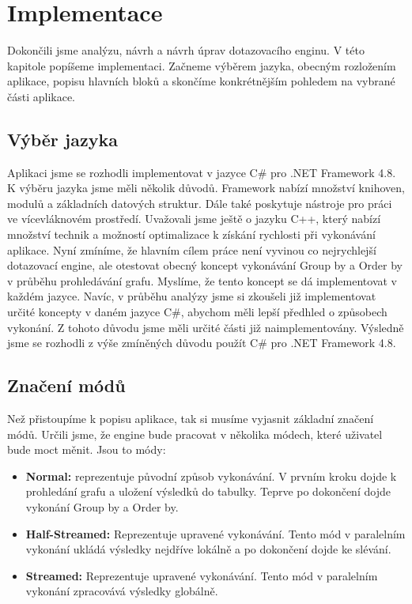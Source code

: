 \chapter{Implementace}
\label{impl}
   
Dokončili jsme analýzu, návrh a návrh úprav dotazovacího enginu.
V této kapitole popíšeme implementaci.
Začneme výběrem jazyka, obecným rozložením aplikace, popisu hlavních bloků a skončíme konkrétnějším pohledem na vybrané části aplikace.

\section{Výběr jazyka}

Aplikaci jsme se rozhodli implementovat v jazyce C\# pro .NET Framework 4.8.
K výběru jazyka jsme měli několik důvodů.
Framework nabízí množství knihoven, modulů a základních datových struktur.
Dále také poskytuje nástroje pro práci ve vícevláknovém prostředí.
Uvažovali jsme ještě o jazyku C++, který nabízí množství technik a možností optimalizace k získání rychlosti při vykonávání aplikace. 
Nyní zmíníme, že hlavním cílem práce není vyvinou co nejrychlejší dotazovací engine, ale otestovat obecný koncept vykonávání Group by a Order by v průběhu prohledávání grafu.
Myslíme, že tento koncept se dá implementovat v každém jazyce.
Navíc, v průběhu analýzy jsme si zkoušeli již implementovat určité koncepty v daném jazyce C\#, abychom měli lepší předhled o způsobech vykonání.
Z tohoto důvodu jsme měli určité části již naimplementovány.
Výsledně jsme se rozhodli z výše zmíněných důvodu použít C\# pro .NET Framework 4.8.

\section{Značení módů}

Než přistoupíme k popisu aplikace, tak si musíme vyjasnit základní značení módů.
Určili jsme, že engine bude pracovat v několika módech, které uživatel bude moct měnit.
Jsou to módy:

\begin{itemize}

\item \textbf{Normal:} reprezentuje původní způsob vykonávání.
V prvním kroku dojde k prohledání grafu a uložení výsledků do tabulky.
Teprve po dokončení dojde vykonání Group by a Order by.

\item \textbf{Half-Streamed:} Reprezentuje upravené vykonávání. 
Tento mód v paralelním vykonání ukládá výsledky nejdříve lokálně a po dokončení dojde ke slévání.

\item \textbf{Streamed:} Reprezentuje upravené vykonávání. 
Tento mód v paralelním vykonání zpracovává výsledky globálně.
\end{itemize}

